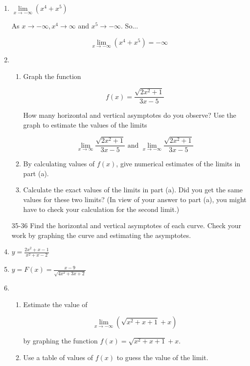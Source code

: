 \documentclass{article}
\begin{document}
\begin{enumerate}
		\item $\lim \limits _{x \to -\infty} (x^4 + x^5)$

			As $x \to -\infty, x^4 \to \infty$ and $x^5 \to -\infty$. So...

			$$\lim \limits _{x \to -\infty} (x^4 + x^5) = -\infty$$


		\item
		\begin{enumerate}
			\item Graph the function

				$$f(x) = \frac{\sqrt{2x^2 + 1}}{3x - 5}$$

				How many horizontal and vertical asymptotes do you observe?
				Use the graph to estimate the values of the limits

				$$\lim \limits _{x \to \infty} \frac{\sqrt{2x^2 + 1}}{3x - 5}
				\text{	and	} \lim \limits _{x \to -\infty} \frac{\sqrt{2x^2 + 1}}{3x - 5}$$

			\item By calculating values of $f(x)$, give numerical estimates of the limits in part (a).

			\item Calculate the exact values of the limits in part (a). Did you get the same values for
				these two limits? (In view of your answer to part (a), you might have to check your
				calculation for the second limit.)
		\end{enumerate}

		\item[35-36] Find the horizontal and vertical asymptotes of each curve. Check your work by graphing
			the curve and estimating the asymptotes.

		\item $y = \frac{2x^2 + x - 1}{x^2 + x - 2}$

		\item $y = F(x) = \frac{x - 9}{\sqrt{4x^2 + 3x + 2}}$
		

		\item
		\begin{enumerate}
			\item Estimate the value of

				$$\lim \limits _{x \to -\infty} (\sqrt{x^2 + x + 1} + x)$$

				by graphing the function $f(x) = \sqrt{x^2 + x + 1} + x$.

			\item Use a table of values of $f(x)$ to guess the value of the limit.


\end{enumerate}
\end{enumerate}
\end{document}
